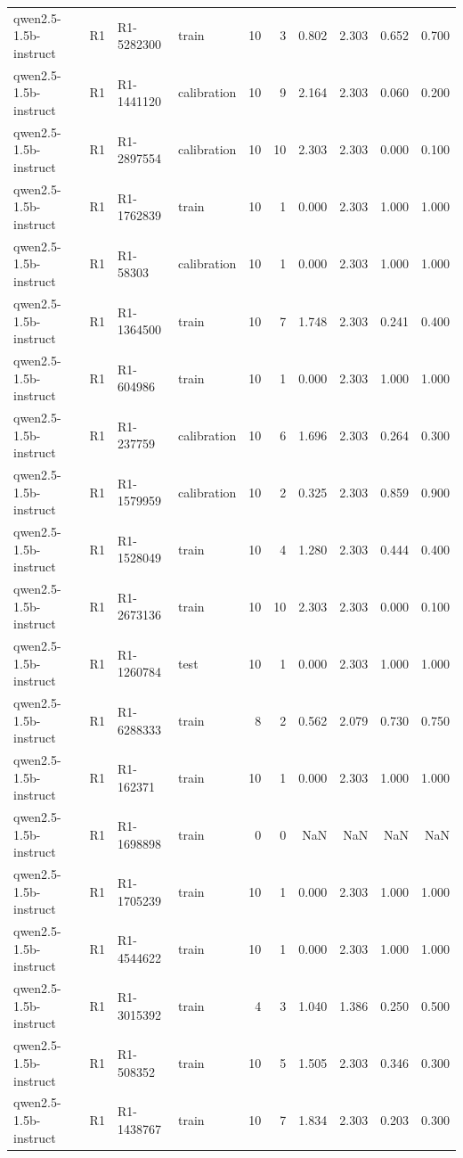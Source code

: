\begin{table}
\begin{tabular}{llllrrrrrr}
qwen2.5-1.5b-instruct & R1 & R1-5282300 & train & 10 & 3 & 0.802 & 2.303 & 0.652 & 0.700 \\
qwen2.5-1.5b-instruct & R1 & R1-1441120 & calibration & 10 & 9 & 2.164 & 2.303 & 0.060 & 0.200 \\
qwen2.5-1.5b-instruct & R1 & R1-2897554 & calibration & 10 & 10 & 2.303 & 2.303 & 0.000 & 0.100 \\
qwen2.5-1.5b-instruct & R1 & R1-1762839 & train & 10 & 1 & 0.000 & 2.303 & 1.000 & 1.000 \\
qwen2.5-1.5b-instruct & R1 & R1-58303 & calibration & 10 & 1 & 0.000 & 2.303 & 1.000 & 1.000 \\
qwen2.5-1.5b-instruct & R1 & R1-1364500 & train & 10 & 7 & 1.748 & 2.303 & 0.241 & 0.400 \\
qwen2.5-1.5b-instruct & R1 & R1-604986 & train & 10 & 1 & 0.000 & 2.303 & 1.000 & 1.000 \\
qwen2.5-1.5b-instruct & R1 & R1-237759 & calibration & 10 & 6 & 1.696 & 2.303 & 0.264 & 0.300 \\
qwen2.5-1.5b-instruct & R1 & R1-1579959 & calibration & 10 & 2 & 0.325 & 2.303 & 0.859 & 0.900 \\
qwen2.5-1.5b-instruct & R1 & R1-1528049 & train & 10 & 4 & 1.280 & 2.303 & 0.444 & 0.400 \\
qwen2.5-1.5b-instruct & R1 & R1-2673136 & train & 10 & 10 & 2.303 & 2.303 & 0.000 & 0.100 \\
qwen2.5-1.5b-instruct & R1 & R1-1260784 & test & 10 & 1 & 0.000 & 2.303 & 1.000 & 1.000 \\
qwen2.5-1.5b-instruct & R1 & R1-6288333 & train & 8 & 2 & 0.562 & 2.079 & 0.730 & 0.750 \\
qwen2.5-1.5b-instruct & R1 & R1-162371 & train & 10 & 1 & 0.000 & 2.303 & 1.000 & 1.000 \\
qwen2.5-1.5b-instruct & R1 & R1-1698898 & train & 0 & 0 & NaN & NaN & NaN & NaN \\
qwen2.5-1.5b-instruct & R1 & R1-1705239 & train & 10 & 1 & 0.000 & 2.303 & 1.000 & 1.000 \\
qwen2.5-1.5b-instruct & R1 & R1-4544622 & train & 10 & 1 & 0.000 & 2.303 & 1.000 & 1.000 \\
qwen2.5-1.5b-instruct & R1 & R1-3015392 & train & 4 & 3 & 1.040 & 1.386 & 0.250 & 0.500 \\
qwen2.5-1.5b-instruct & R1 & R1-508352 & train & 10 & 5 & 1.505 & 2.303 & 0.346 & 0.300 \\
qwen2.5-1.5b-instruct & R1 & R1-1438767 & train & 10 & 7 & 1.834 & 2.303 & 0.203 & 0.300 \\

\end{tabular}
\end{table}
